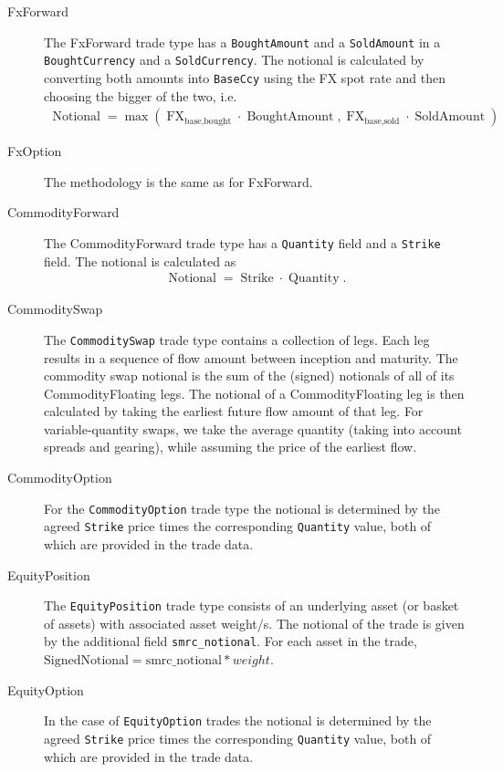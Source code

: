 \begin{description}
	\item[FxForward] The FxForward trade type has a \texttt{BoughtAmount} and a \texttt{SoldAmount} in a \texttt{BoughtCurrency} and a \texttt{SoldCurrency}. The notional is calculated by converting both amounts into \texttt{BaseCcy} using the FX spot rate and then choosing the bigger of the two, i.e.
	\begin{align*}
		\operatorname{Notional} = \max( \operatorname{FX}_{\text{base,bought}} \cdot \operatorname{BoughtAmount}, \operatorname{FX}_{\text{base,sold}} \cdot \operatorname{SoldAmount})
	\end{align*}
	\item[FxOption] The methodology is the same as for FxForward.
	\item[CommodityForward] The CommodityForward trade type has a \texttt{Quantity} field and a \texttt{Strike} field. The notional is calculated as
	\begin{align*}
		\operatorname{Notional} = \operatorname{Strike} \cdot \operatorname{Quantity}.
	\end{align*}
	\item[CommoditySwap] The \texttt{CommoditySwap} trade type contains a collection of legs. Each leg results in a sequence of flow amount between inception and maturity. The commodity swap notional is the sum of the (signed) notionals of all of its CommodityFloating legs. The notional of a CommodityFloating leg is then calculated by taking the earliest future flow amount of that leg. For variable-quantity swaps, we take the average quantity (taking into account spreads and gearing), while assuming the price of the earliest flow.
	\item[CommodityOption] For the \texttt{CommodityOption} trade type the notional is determined by the agreed \texttt{Strike} price times the corresponding \texttt{Quantity} value, both of which are provided in the trade data. 
	\item[EquityPosition] The \texttt{EquityPosition} trade type consists of an underlying asset (or basket of assets) with associated asset weight/s. The notional of the trade is given by the additional field \texttt{smrc\_notional}. For each asset in the trade, $\text{SignedNotional} = \text{smrc\_notional} * {weight}$.
	\item[EquityOption] In the case of \texttt{EquityOption} trades the notional is determined by the agreed \texttt{Strike} price times the corresponding \texttt{Quantity} value, both of which are provided in the trade data. 

\end{description}
